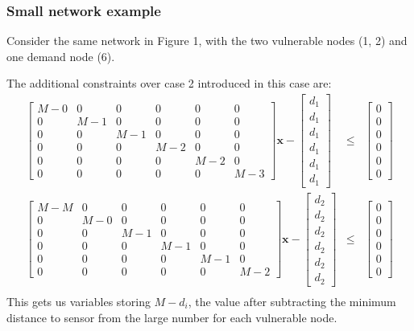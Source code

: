 \documentclass[authoryear,preprint,review,12pt]{elsarticle}
\begin{document}
\subsubsection{Small network example}

Consider the same network in Figure 1, with the two vulnerable nodes
(1, 2) and one demand node (6).

The additional constraints over case 2 introduced in this case are:
\begin{eqnarray*}
\left[\begin{array}{cccccc}
M-0 & 0 & 0 & 0 & 0 & 0\\
0 & M-1 & 0 & 0 & 0 & 0\\
0 & 0 & M-1 & 0 & 0 & 0\\
0 & 0 & 0 & M-2 & 0 & 0\\
0 & 0 & 0 & 0 & M-2 & 0\\
0 & 0 & 0 & 0 & 0 & M-3
\end{array}\right]\mathbf{x}-\left[\begin{array}{c}
d_{1}\\
d_{1}\\
d_{1}\\
d_{1}\\
d_{1}\\
d_{1}
\end{array}\right] & \leq & \left[\begin{array}{c}
0\\
0\\
0\\
0\\
0\\
0
\end{array}\right]\\
\left[\begin{array}{cccccc}
M-M & 0 & 0 & 0 & 0 & 0\\
0 & M-0 & 0 & 0 & 0 & 0\\
0 & 0 & M-1 & 0 & 0 & 0\\
0 & 0 & 0 & M-1 & 0 & 0\\
0 & 0 & 0 & 0 & M-1 & 0\\
0 & 0 & 0 & 0 & 0 & M-2
\end{array}\right]\mathbf{x}-\left[\begin{array}{c}
d_{2}\\
d_{2}\\
d_{2}\\
d_{2}\\
d_{2}\\
d_{2}
\end{array}\right] & \leq & \left[\begin{array}{c}
0\\
0\\
0\\
0\\
0\\
0
\end{array}\right]\\
\end{eqnarray*}
This gets us variables storing $M-d_{i}$, the value after subtracting
the minimum distance to sensor from the large number for each vulnerable
node.
\end{document}
